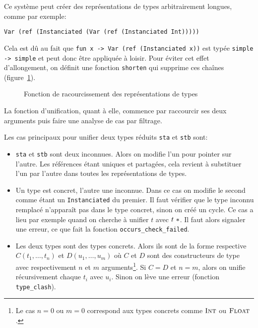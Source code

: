 Ce système peut créer des représentations de types arbitrairement longues, comme
par exemple:

\texttt{Var (ref (Instanciated (Var (ref (Instanciated Int)))))}

Cela est dû au fait que \texttt{fun x -> Var (ref (Instanciated x))} est typée
\texttt{simple -> simple} et peut donc être appliquée à loisir. Pour éviter cet
effet d'allongement, on définit une fonction \texttt{shorten} qui supprime ces
chaînes (figure~\ref{fig:implem-shorten}).


\begin{figure}


\caption{Fonction de racourcissement des représentations de types}
\label{fig:implem-shorten}
\end{figure}

La fonction d'unification, quant à elle, commence par raccourcir ses deux
arguments puis faire une analyse de cas par filtrage.

Les cas principaux pour unifier deux types réduits \texttt{sta} et \texttt{stb}
sont:

\begin{itemize}

\item \texttt{sta} et \texttt{stb} sont deux inconnues. Alors on modifie l'un
  pour pointer sur l'autre. Les références étant uniques et partagées, cela
  revient à substituer l'un par l'autre dans toutes les représentations de
  types.

\item Un type est concret, l'autre une inconnue. Dans ce cas on modifie le
  second comme étant un \texttt{Instanciated} du premier. Il faut vérifier que
  le type inconnu remplacé n'apparaît pas dans le type concret, sinon on créé un
  cycle. Ce cas a lieu par exemple quand on cherche à unifier $t$ avec
  $t~*$. Il faut alors signaler une erreur, ce que fait la fonction
  \texttt{occurs\_check\_failed}.

\item Les deux types sont des types concrets. Alors ils sont de la forme
  respective
  $C (t_1, …, t_n)$
  et
  $D (u_1, …, u_m)$ où $C$ et $D$ sont des constructeurs de type avec
  respectivement $n$ et $m$ arguments\footnote{
    Le cas $n = 0$ ou $m = 0$ correspond aux types concrets comme $\textsc{Int}$ ou
    $\textsc{Float}$.
  }. Si $C = D$ et
  $n = m$, alors on unifie récursivement chaque $t_i$ avec $u_i$. Sinon on lève
  une erreur (fonction \texttt{type\_clash}).


\end{itemize}

